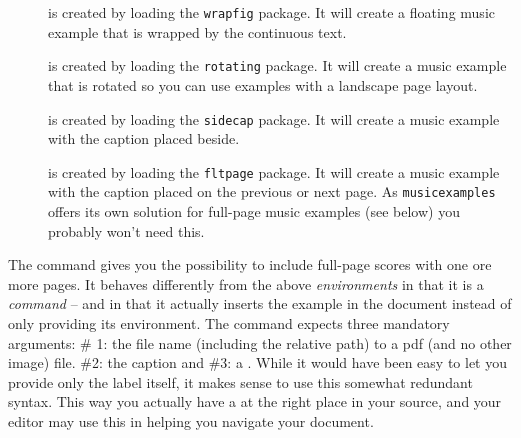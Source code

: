 \documentclass[../openLilyLib]{subfiles}
\begin{document}
\begin{description}
\item[] is created by loading the \texttt{wrapfig} package.
It will create a floating music example that is wrapped by the continuous text.
\item[] is created by loading the \texttt{rotating} package.
It will create a music example that is rotated so you can use examples with a landscape page layout.
\item[] is created by loading the \texttt{sidecap} package.
It will create a music example with the caption placed beside.
\item[{}] is created by loading the \texttt{fltpage} package.
It will create a music example with the caption placed on the previous or next page.
As \texttt{musicexamples} offers its own solution for full-page music examples (see below) you probably won't need this.
\end{description}

The  command gives you the possibility to include full-page scores with one ore more pages.
It behaves differently from the above \emph{environments} in that it is a \emph{command} -- and in that it actually inserts the example in the document instead of only providing its environment.
The command expects three mandatory arguments: 
\# 1: the file name (including the relative path) to a pdf (and no other image) file.
\#2: the caption and \#3: a .
While it would have been easy to let you provide only the label itself, it makes sense to use this somewhat redundant syntax.
This way you actually have a  at the right place in your source, and your editor may use this in helping you navigate your document.
\end{document}
